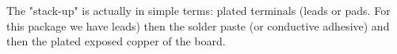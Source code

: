 \documentclass[final]{cubedoc}
\begin{document}
	
	
	
	The "stack-up" is actually in simple terms: plated terminals (leads or pads. For this package we have leads) then the solder paste (or conductive adhesive) and then the plated exposed copper of the board. 
	
	
	
	
	
	
	
	
\end{document}
